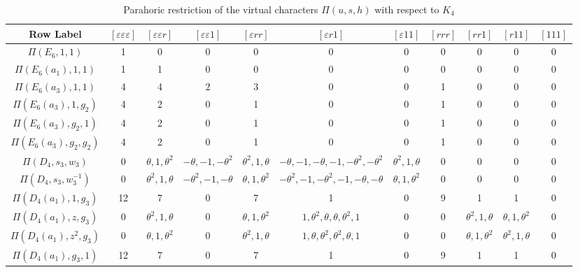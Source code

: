     \newpage


\begin{landscape}

    \begin{table}[ht]
        \centering
        \caption{Parahoric restriction of the virtual characters $\Pi(u,s,h)$ with respect to $K_4$}
        \label{tab:pi_combinations_a2a2a2}
        \begin{adjustbox}{max width=\linewidth}
        \begin{tabular}{|c|cccccccccc|}
        \hline
        Row Label & $[\varepsilon\varepsilon\varepsilon]$ & $[\varepsilon\varepsilon r]$ & $[\varepsilon\varepsilon 1]$ & $[\varepsilon r r]$ & $[\varepsilon r 1]$ & $[\varepsilon 1 1]$ & $[r r r]$ & $[r r 1]$ & $[r 1 1]$ & $[1 1 1]$ \\ \hline
        $\Pi(E_6,1,1)$          & 1 & 0 & 0 & 0 & 0 & 0 & 0 & 0 & 0 & 0 \\ \hline
        $\Pi(E_6(a_1),1,1)$     & 1 & 1 & 0 & 0 & 0 & 0 & 0 & 0 & 0 & 0 \\ \hline
        $\Pi(E_6(a_3),1,1)$     & 4 & 4 & 2 & 3 & 0 & 0 & 1 & 0 & 0 & 0 \\
        $\Pi(E_6(a_3),1,g_2)$   & 4 & 2 & 0 & 1 & 0 & 0 & 1 & 0 & 0 & 0 \\
        $\Pi(E_6(a_3),g_2,1)$   & 4 & 2 & 0 & 1 & 0 & 0 & 1 & 0 & 0 & 0 \\
        $\Pi(E_6(a_3),g_2,g_2)$ & 4 & 2 & 0 & 1 & 0 & 0 & 1 & 0 & 0 & 0 \\ \hline
        $\Pi(D_4,s_3,w_3)$      & 0 & $\theta,1,\theta^2$ & $-\theta,-1,-\theta^2$ & $\theta^2,1,\theta$ & $-\theta,-1,-\theta,-1,-\theta^2,-\theta^2$ & $\theta^2,1,\theta$ & 0 & 0 & 0 & 0 \\
        $\Pi(D_4,s_3,w_3^{-1})$ & 0 & $\theta^2,1,\theta$ & $-\theta^2,-1,-\theta$ & $\theta,1,\theta^2$ & $-\theta^2,-1,-\theta^2,-1,-\theta,-\theta$ & $\theta,1,\theta^2$ & 0 & 0 & 0 & 0 \\ \hline
        $\Pi(D_4(a_1),1,g_3)$   & 12 & 7 & 0 & 7 & 1 & 0 & 9 & 1 & 1 & 0 \\
        $\Pi(D_4(a_1),z,g_3)$   & 0 & $\theta^2,1,\theta$ & 0 & $\theta,1,\theta^2$ & $1,\theta^2,\theta,\theta,\theta^2,1$ & 0 & 0 & $\theta^2,1,\theta$ & $\theta,1,\theta^2$ & 0 \\
        $\Pi(D_4(a_1),z^2,g_3)$ & 0 & $\theta,1,\theta^2$ & 0 & $\theta^2,1,\theta$ & $1,\theta,\theta^2,\theta^2,\theta,1$ & 0 & 0 & $\theta,1,\theta^2$ & $\theta^2,1,\theta$ & 0 \\
        $\Pi(D_4(a_1),g_3,1)$   & 12 & 7 & 0 & 7 & 1 & 0 & 9 & 1 & 1 & 0 \\

\end{tabular}
\end{adjustbox}
\end{table}
\end{landscape}
